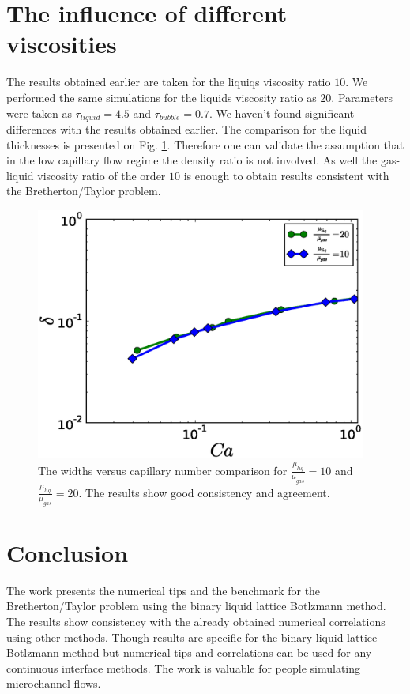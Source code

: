 \documentclass{article}
\begin{document}
\section{The influence of different viscosities}
The results obtained earlier are taken for the liquiqs viscosity ratio $10$.
We performed the same simulations for the liquids viscosity ratio as $20$.
Parameters were taken as $\tau_{liquid}=4.5$ and $\tau_{bubble}=0.7$. We
haven't found significant differences with the results obtained earlier. The
comparison for the liquid thicknesses is presented on Fig.
\ref{fig:capillary:viscous}. Therefore one can validate the assumption that in
the low capillary flow regime the density ratio is not involved. As well the
gas-liquid viscosity ratio of the order $10$ is enough to obtain results
consistent with the Bretherton/Taylor problem. 
\begin{figure}
\includegraphics[width=0.97\textwidth]{Figures/Capillary_Viscous/capillaries_viscous.eps}
\caption{The widths versus capillary number comparison for
$\frac{\mu_{liq}}{\mu_{gas}}=10$ and $\frac{\mu_{liq}}{\mu_{gas}}=20$. The
results show good consistency and agreement.\label{fig:capillary:viscous}}
\end{figure}

\section{Conclusion}
The work presents the numerical tips and the benchmark for the
Bretherton/Taylor problem using the binary liquid lattice Botlzmann method. The
results show consistency with the already obtained numerical correlations using
other methods. Though results are specific for the binary liquid lattice
Botlzmann method but numerical tips and correlations can be used for any
continuous interface methods. The work is valuable for people simulating
microchannel flows.



\end{document}
